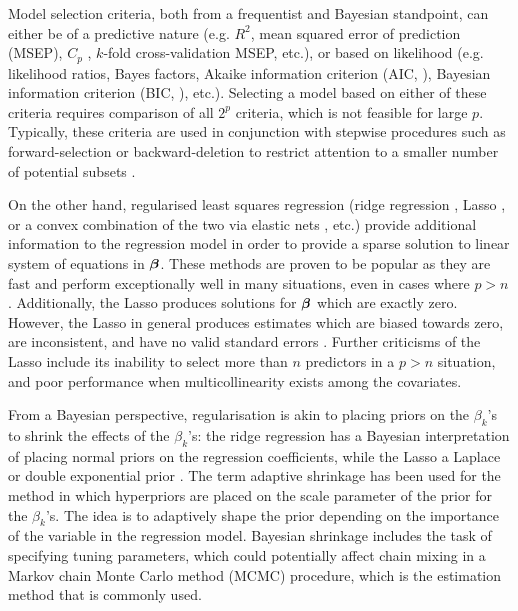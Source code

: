 \documentclass[11pt,twoside,openright]{report}
\begin{document}
Model selection criteria, both from a frequentist and Bayesian standpoint, can either be of a predictive nature (e.g.  $R^2$, mean squared error of prediction (MSEP), $C_p$ \citep{mallows1973some}, $k$-fold cross-validation MSEP, etc.), or based on likelihood (e.g. likelihood ratios, Bayes factors, Akaike information criterion (AIC, \cite{akaike1973}), Bayesian information criterion (BIC, \cite{schwarz1978estimating}), etc.).
Selecting a model based on either of these criteria requires comparison of all $2^p$ criteria, which is not feasible for large $p$.
Typically, these criteria are used in conjunction with stepwise procedures such as forward-selection or backward-deletion to restrict attention to a smaller number of potential subsets \citep{George1993,miller2002subset}.

On the other hand, regularised least squares regression (ridge regression \citep{hoerl1970ridge}, Lasso \citep{tibshirani1996regression}, or a convex combination of the two via elastic nets \citep{zou2005regularization}, etc.) provide additional information to the regression model in order to provide a sparse solution to linear system of equations in ${\bm\beta}$.
These methods are proven to be popular as they are fast and perform exceptionally well in many situations, even in cases where $p > n$.
Additionally, the Lasso produces solutions for ${\bm\beta}$ which are exactly zero.
However, the Lasso in general produces estimates which are biased towards zero, are inconsistent, and have no valid standard errors \citep{friedman2001elements,kyung2010penalized}.
Further criticisms of the Lasso include its inability to select more than $n$ predictors in a $p>n$ situation, and poor performance when multicollinearity exists among the covariates.

From a Bayesian perspective, regularisation is akin to placing priors on the $\beta_k$'s to shrink the effects of the $\beta_k$'s: the ridge regression has a Bayesian interpretation of placing normal priors on the regression coefficients, while the Lasso a Laplace or double exponential prior \citep{park2008bayesian}.
The term adaptive shrinkage has been used for the method in which hyperpriors are placed on the scale parameter of the prior for the $\beta_k$'s.
The idea is to adaptively shape the prior depending on the importance of the variable in the regression model.
Bayesian shrinkage includes the task of specifying tuning parameters, which could potentially affect chain mixing in a Markov chain Monte Carlo method (MCMC) procedure, which is the estimation method that is commonly used.
\end{document}
